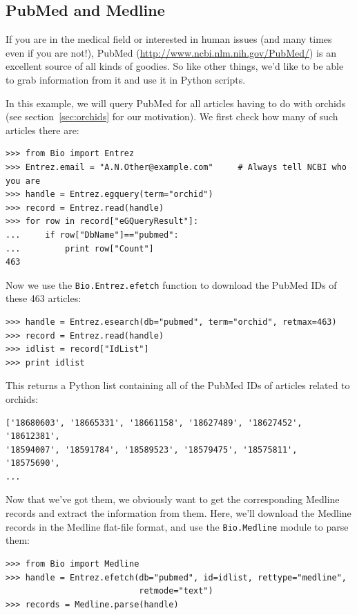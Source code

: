 \documentclass{report}
\begin{document}
\subsection{PubMed and Medline}
\label{subsec:pub_med}

If you are in the medical field or interested in human issues (and many times even if you are not!), PubMed (\url{http://www.ncbi.nlm.nih.gov/PubMed/}) is an excellent source of all kinds of goodies. So like other things, we'd like to be able to grab information from it and use it in Python scripts.

In this example, we will query PubMed for all articles having to do with orchids (see section~\ref{sec:orchids} for our motivation). We first check how many of such articles there are:

\begin{verbatim}
>>> from Bio import Entrez
>>> Entrez.email = "A.N.Other@example.com"     # Always tell NCBI who you are
>>> handle = Entrez.egquery(term="orchid")
>>> record = Entrez.read(handle)
>>> for row in record["eGQueryResult"]:
...     if row["DbName"]=="pubmed":
...         print row["Count"]
463
\end{verbatim}

Now we use the \verb+Bio.Entrez.efetch+ function to download the PubMed IDs of these 463 articles:
\begin{verbatim}
>>> handle = Entrez.esearch(db="pubmed", term="orchid", retmax=463)
>>> record = Entrez.read(handle)
>>> idlist = record["IdList"]
>>> print idlist
\end{verbatim}


This returns a Python list containing all of the PubMed IDs of articles related to orchids:
\begin{verbatim}
['18680603', '18665331', '18661158', '18627489', '18627452', '18612381',
'18594007', '18591784', '18589523', '18579475', '18575811', '18575690',
...
\end{verbatim}

Now that we've got them, we obviously want to get the corresponding Medline records and extract the information from them. Here, we'll download the Medline records in the Medline flat-file format, and use the \verb+Bio.Medline+ module to parse them:
\begin{verbatim}
>>> from Bio import Medline
>>> handle = Entrez.efetch(db="pubmed", id=idlist, rettype="medline",
                           retmode="text")
>>> records = Medline.parse(handle)
\end{verbatim}
\end{document}
